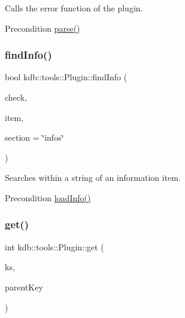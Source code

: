 Calls the error function of the plugin. 

\begin{DoxyPrecond}{Precondition}
\hyperlink{classkdb_1_1tools_1_1Plugin_adfcba2fbdeb436a1083410df804d5fb0}{parse()} 
\end{DoxyPrecond}
\mbox{\label{classkdb_1_1tools_1_1Plugin_a7911f8c46aea6fe4ec6fcb4788b77beb}} 
\subsubsection{\texorpdfstring{find\+Info()}{findInfo()}}
{\footnotesize\ttfamily bool kdb\+::tools\+::\+Plugin\+::find\+Info (\begin{DoxyParamCaption}\item[{std\+::string}]{check,  }\item[{std\+::string}]{item,  }\item[{std\+::string}]{section = {\ttfamily \char`\"{}infos\char`\"{}} }\end{DoxyParamCaption})}



Searches within a string of an information item. 

\begin{DoxyPrecond}{Precondition}
\hyperlink{classkdb_1_1tools_1_1Plugin_a3a0c6a956d1714002ef9baf8c9d99167}{load\+Info()} 
\end{DoxyPrecond}
\mbox{\label{classkdb_1_1tools_1_1Plugin_a2aa6ff55f9cf81a59d2a8d271fe68e0f}} 
\subsubsection{\texorpdfstring{get()}{get()}}
{\footnotesize\ttfamily int kdb\+::tools\+::\+Plugin\+::get (\begin{DoxyParamCaption}\item[{\hyperlink{classkdb_1_1KeySet}{kdb\+::\+Key\+Set} \&}]{ks,  }\item[{\hyperlink{classkdb_1_1Key}{kdb\+::\+Key} \&}]{parent\+Key }\end{DoxyParamCaption})}



